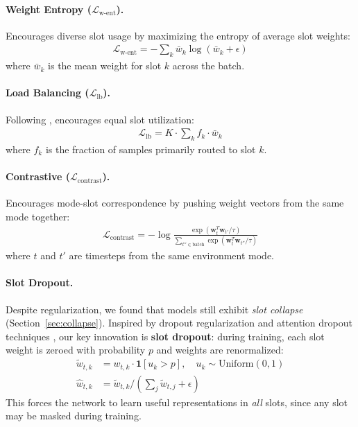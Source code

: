 \documentclass{article}
\newcommand{\bw}{\mathbf{w}}
\begin{document}
\paragraph{Weight Entropy ($\mathcal{L}_{\text{w-ent}}$).} Encourages diverse slot usage by maximizing the entropy of average slot weights:
\begin{align}
    \mathcal{L}_{\text{w-ent}} = -\sum_k \bar{w}_k \log(\bar{w}_k + \epsilon)
\end{align}
where $\bar{w}_k$ is the mean weight for slot $k$ across the batch.

\paragraph{Load Balancing ($\mathcal{L}_{\text{lb}}$).} Following \citet{shazeer2017outrageously}, encourages equal slot utilization:
\begin{align}
    \mathcal{L}_{\text{lb}} = K \cdot \sum_k f_k \cdot \bar{w}_k
\end{align}
where $f_k$ is the fraction of samples primarily routed to slot $k$.

\paragraph{Contrastive ($\mathcal{L}_{\text{contrast}}$).} Encourages mode-slot correspondence by pushing weight vectors from the same mode together:
\begin{align}
    \mathcal{L}_{\text{contrast}} = -\log \frac{\exp(\bw_t^T \bw_{t'} / \tau)}{\sum_{t'' \in \text{batch}} \exp(\bw_t^T \bw_{t''} / \tau)}
\end{align}
where $t$ and $t'$ are timesteps from the same environment mode.

\paragraph{Slot Dropout.} Despite regularization, we found that models still exhibit \emph{slot collapse} (Section~\ref{sec:collapse}). Inspired by dropout regularization \citep{srivastava2014dropout} and attention dropout techniques \citep{zhou2020scheduled}, our key innovation is \textbf{slot dropout}: during training, each slot weight is zeroed with probability $p$ and weights are renormalized:
\begin{align}
    \tilde{w}_{t,k} &= w_{t,k} \cdot \mathbf{1}[u_k > p], \quad u_k \sim \text{Uniform}(0,1) \\
    \hat{w}_{t,k} &= \tilde{w}_{t,k} / (\sum_j \tilde{w}_{t,j} + \epsilon)
\end{align}
This forces the network to learn useful representations in \emph{all} slots, since any slot may be masked during training.
\end{document}
